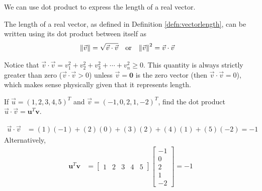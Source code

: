 We can use dot product to express the length of a real vector.
\begin{proper}
\label{proper:lengthdot}
The length of a real vector, as defined in Definition \ref{defn:vectorlength}, can be written using its dot product between itself as
\begin{align*}
\norm{\vec{v}} &= \sqrt{\vec{v} \cdot \vec{v}} & &\text{or} &
\norm{\vec{v}}^2 &= \vec{v} \cdot \vec{v}
\end{align*}
\end{proper}
Notice that $\vec{v} \cdot \vec{v} = v_1^2 + v_2^2 + v_3^2 + \cdots + v_n^2 \geq 0$. This quantity is always strictly greater than zero ($\vec{v} \cdot \vec{v} > 0$) unless $\vec{v} = \textbf{0}$ is the zero vector (then $\vec{v} \cdot \vec{v} = 0$), which makes sense physically given that it represents length.

\begin{exmp}
\label{exmp:dotproduct5d}
If $\vec{u} = (1, 2, 3, 4, 5)^T$ and $\vec{v} = (-1, 0, 2, 1, -2)^T$, find the dot product $\vec{u} \cdot \vec{v} = \textbf{u}^T\textbf{v}$.
\end{exmp}
\begin{solution}
\begin{align*}
\vec{u} \cdot \vec{v} &= (1)(-1) + (2)(0) + (3)(2) + (4)(1) + (5)(-2) = -1
\end{align*}
Alternatively,
\begin{align*}
\textbf{u}^T\textbf{v} &=
\begin{bmatrix}
1 & 2 & 3 & 4 & 5
\end{bmatrix}
\begin{bmatrix}
-1 \\
0 \\
2 \\
1 \\
-2
\end{bmatrix}
= -1
\end{align*}
\end{solution}

